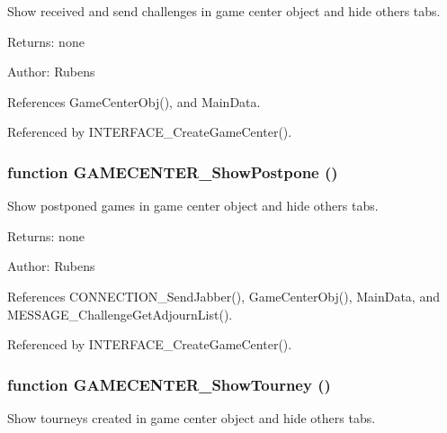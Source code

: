 Show received and send challenges in game center object and hide others tabs. 

\begin{Desc}
\item[Returns:]none \end{Desc}
\begin{Desc}
\item[Author:]Rubens \end{Desc}


References GameCenterObj(), and MainData.

Referenced by INTERFACE\_\-CreateGameCenter().
\subsubsection[GAMECENTER\_\-ShowPostpone]{\setlength{\rightskip}{0pt plus 5cm}function GAMECENTER\_\-ShowPostpone ()}\label{gamecenter_2gamecenter_8js_99db2114475313332403605f208ccd85}


Show postponed games in game center object and hide others tabs. 

\begin{Desc}
\item[Returns:]none \end{Desc}
\begin{Desc}
\item[Author:]Rubens \end{Desc}


References CONNECTION\_\-SendJabber(), GameCenterObj(), MainData, and MESSAGE\_\-ChallengeGetAdjournList().

Referenced by INTERFACE\_\-CreateGameCenter().
\subsubsection[GAMECENTER\_\-ShowTourney]{\setlength{\rightskip}{0pt plus 5cm}function GAMECENTER\_\-ShowTourney ()}\label{gamecenter_2gamecenter_8js_803ce9adc6df57317c48aab077df0d31}


Show tourneys created in game center object and hide others tabs. 

